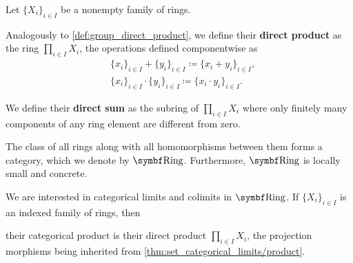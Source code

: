 \begin{definition}\label{def:ring_direct_product}
  Let \( \{ X_i \}_{i \in I} \) be a nonempty family of rings.

  Analogously to \cref{def:group_direct_product}, we define their \textbf{direct product} as the ring \( \prod_{i \in I} X_i \), the operations defined componentwise as
  \begin{align*}
    &\{ x_i \}_{i \in I} + \{ y_i \}_{i \in I}
    \coloneqq
    \{ x_i + y_i \}_{i \in I}, \\
    &\{ x_i \}_{i \in I} \cdot \{ y_i \}_{i \in I}
    \coloneqq
    \{ x_i \cdot y_i \}_{i \in I}.
  \end{align*}

  We define their \textbf{direct sum} as the subring of \( \prod_{i \in I} X_i \) where only finitely many components of any ring element are different from zero.
\end{definition}

\begin{definition}\label{def:category_of_rings}
  The class of all rings along with all homomorphisms between them forms a category, which we denote by \( \Bold{Ring} \). Furthermore, \( \Bold{Ring} \) is locally small and concrete.
\end{definition}

\begin{proposition}\label{thm:ring_categorical_limits}
  We are interested in categorical limits and colimits in \( \Bold{Ring} \). If \( \{ X_i \}_{i \in I} \) is an indexed family of rings, then
  \begin{defenum}
     their categorical product is their direct product \( \prod_{i \in I} X_i \), the projection morphisms being inherited from \cref{thm:set_categorical_limits/product}.
  \end{defenum}
\end{proposition}


